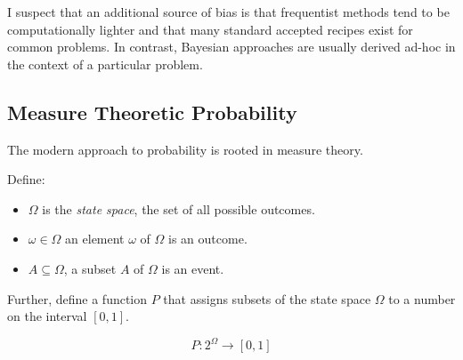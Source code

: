 I suspect that an additional source of bias is that frequentist methods tend to be computationally lighter and that many standard accepted recipes exist for common problems. In contrast, Bayesian approaches are usually derived ad-hoc in the context of a particular problem.

\subsection{Measure Theoretic Probability}
The modern approach to probability is rooted in measure theory. 

Define: 

\begin{itemize}
\item $\Omega$ is the \textit{state space}, the set of all possible outcomes. 
\item $\omega \in \Omega$ an element $\omega$ of $\Omega$ is an outcome.
\item $A \subseteq \Omega$, a subset $A$ of $\Omega$ is an event.
\end{itemize}

Further, define a function $P$ that assigns subsets of the state space $\Omega$ to a number on the interval $[0,1]$. 

\begin{equation}
P: 2^{\Omega} \rightarrow [0,1]
\end{equation}

